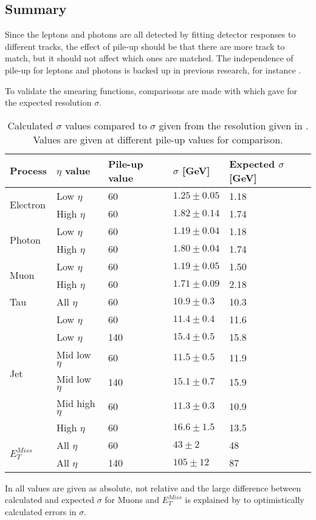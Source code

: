 \subsection{Summary}\label{sec:res:subsec:sum}
Since the leptons and photons are all detected by fitting detector responses to different tracks, the effect of pile-up should be that there are more track to match, but it should not affect which ones are matched. The independence of pile-up for leptons and photons is backed up in previous research, for instance \citep{Electronperf:2011, ATLAS:LOI2}.

To validate the smearing functions, comparisons are made with \citep{ATL-PHYS-PUB-2013-004} which gave  for the expected resolution $\sigma$.
\renewcommand{\arraystretch}{1.2} %
\begin{table}[H]
\begin{center}
\begin{tabular}{|l|l|l|l|l|}
\hline
Process& $\eta$ value & Pile-up value &$\sigma$ [GeV]& Expected $\sigma$ [GeV]\\ \hline
\multirow{2}{*}{Electron}& Low $\eta$&60&$1.25 \pm 0.05$&1.18\\
&High $\eta$&60&$1.82 \pm 0.14$&1.74\\ \hline
\multirow{2}{*}{Photon} & Low $\eta$&60&$1.19 \pm 0.04$&1.18\\
&High $\eta$&60&$1.80 \pm 0.04$&1.74\\ \hline
\multirow{2}{*}{Muon} & Low $\eta$&60&$1.19 \pm 0.05$&1.50\\
&High $\eta$&60&$1.71 \pm 0.09$&2.18\\ \hline
Tau& All $\eta$&60&$10.9 \pm 0.3$&10.3\\ \hline
\multirow{6}{*}{Jet} &Low $\eta$&60&$11.4 \pm 0.4$&11.6\\
&Low $\eta$&140&$15.4 \pm 0.5$&15.8\\
&Mid low $\eta$&60&$11.5 \pm 0.5$&11.9\\
&Mid low $\eta$&140&$15.1 \pm 0.7$&15.9\\
&Mid high $\eta$&60&$11.3 \pm 0.3$&10.9\\
&High $\eta$&60&$16.6 \pm 1.5$&13.5\\ \hline
\multirow{2}{*}{$E_T^{Miss}$}&All $\eta$&60&$43 \pm 2$&48\\ 
&All $\eta$&140&$105 \pm 12$&87\\  \hline
\end{tabular}
\end{center}
\caption{Calculated $\sigma$ values compared to $\sigma$ given from the resolution given in . Values are given at different pile-up values for comparison.}
\label{tab:sigmaval}
\end{table}
\renewcommand{\arraystretch}{1.0} %
In  all values are given as absolute, not relative and the large difference between calculated and expected $\sigma$ for Muons and $E_T^{Miss}$ is explained by to optimistically calculated errors in $\sigma$.

